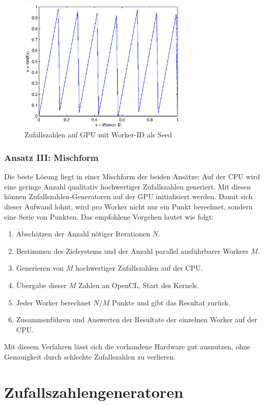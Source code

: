 \documentclass{book}
\begin{document}
\begin{refsection}
\begin{figure}[ht!]
	\centering
	\includegraphics[width=8cm]{images/idAsSeed.eps}
	\caption{Zufallszahlen auf GPU mit Worker-ID als Seed}
	\label{fig:OpenCL_ID_Seed}
\end{figure}

\subsubsection{Ansatz III: Mischform}
Die beste Lösung liegt in einer Mischform der beiden Ansätze: Auf der CPU wird eine geringe Anzahl qualitativ hochwertiger Zufallszahlen generiert. Mit diesen können Zufallszahlen-Generatoren auf der GPU initialisiert werden. Damit sich dieser Aufwand lohnt, wird pro Worker nicht nur ein Punkt berechnet, sondern eine Serie von Punkten. Das empfohlene Vorgehen lautet wie folgt:
\begin{enumerate}
	\item Abschätzen der Anzahl nötiger Iterationen $N$.
	\item Bestimmen des Zielsystems und der Anzahl parallel ausführbarer Workers $M$.
	\item Generieren von $M$ hochwertiger Zufallszahlen auf der CPU.
	\item Übergabe dieser $M$ Zahlen an OpenCL, Start des Kernels.
	\item Jeder Worker berechnet $N/M$ Punkte und gibt das Resultat zurück.
	\item Zusammenführen und Auswerten der Resultate der einzelnen Worker auf der CPU.
\end{enumerate}

Mit diesem Verfahren lässt sich die vorhandene Hardware gut ausnutzen, ohne Genauigkeit durch schlechte Zufallszahlen zu verlieren. 

\clearpage
\section{Zufallszahlengeneratoren} 


\end{refsection}
\end{document}
